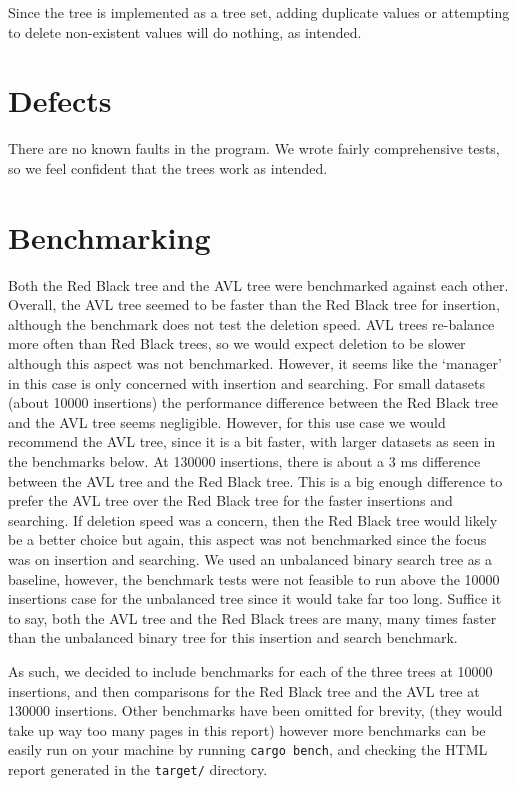 \documentclass[letterpaper]{article}
\begin{document}
Since the tree is implemented as a tree set, adding duplicate values or
attempting to delete non-existent values will do nothing, as intended.

\section{Defects}

There are no known faults in the program.
We wrote fairly comprehensive tests, so we feel confident that the trees work as
intended.

\section{Benchmarking}
Both the Red Black tree and the AVL tree were benchmarked against each other.
Overall, the AVL tree seemed to be faster than the Red Black tree for insertion,
although the benchmark does not test the deletion speed. AVL trees re-balance
more often than Red Black trees, so we would expect deletion to be slower
although this aspect was not benchmarked.  However, it seems like the `manager'
in this case is only concerned with insertion and searching. For small datasets
(about 10000 insertions) the performance difference between the Red Black tree
and the AVL tree seems negligible. However, for this use case we would recommend
the AVL tree, since it is a bit faster, with larger datasets as seen in the
benchmarks below. At 130000 insertions, there is about a 3 ms difference between
the AVL tree and the Red Black tree. This is a big enough difference to prefer
the AVL tree over the Red Black tree for the faster insertions and searching.
If deletion speed was a concern, then the Red Black tree would
likely be a better choice but again, this aspect was not benchmarked since the
focus was on insertion and searching. We used an unbalanced binary search tree
as a baseline, however, the benchmark tests were not feasible to run above the
10000 insertions case for the unbalanced tree since it would take far too long.
Suffice it to say, both the AVL tree and the Red Black trees are many, many
times faster than the unbalanced binary tree for this insertion and search
benchmark.

As such, we decided to include benchmarks for each of the three trees at 10000
insertions, and then comparisons for the Red Black tree and the AVL tree at
130000 insertions. Other benchmarks have been omitted for brevity,
(they would take up way too many pages in this report)
however more benchmarks can be easily run on your machine by running
\verb|cargo bench|, and checking the HTML report generated in the
\texttt{target/} directory.
\end{document}
